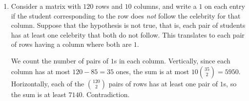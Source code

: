 \documentclass[10pt,paper=letter]{scrartcl}
\begin{document}
\begin{enumerate}
\item Consider a matrix with $120$ rows and $10$ columns, and write a $1$ on each entry if the student corresponding to the row does \emph{not} follow the celebrity for that column. Suppose that the hypothesis is not true, that is, each pair of students has at least one celebrity that both do not follow. This translates to each pair of rows having a column where both are $1$.

We count the number of pairs of $1$s in each column. Vertically, since each column has at most $120-85=35$ ones, the sum is at most $10\binom{35}2 = 5950$. Horizontally, each of the $\binom{120}2$ pairs of rows has at least one pair of $1$s, so the sum is at least $7140$. Contradiction.

\end{enumerate}
\end{document}

